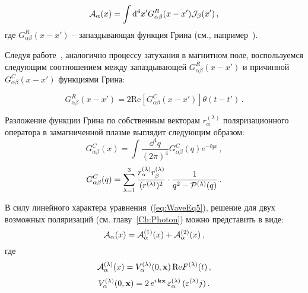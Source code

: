 \begin{equation}\label{eq:RetSol}
	{\cal A}_\alpha(x)=\int \mathrm{d}^4 x' G^R_{\alpha \beta}(x-x'){\cal J}_\beta(x')\, ,
\end{equation}
где $G^R_{\alpha \beta}(x-x')$ -- запаздывающая функция Грина (см., например~\cite{Landau:2001}).

Следуя работе~\cite{MikhChist:2001}, аналогично процессу затухания в магнитном 
поле, воспользуемся следующим соотношением между запаздывающей 
$G^R_{\alpha\beta}(x-x')$ и причинной $G^C_{\alpha\beta}(x-x')$ функциями Грина:

\begin{equation}\label{eq:RetCasualGreen}
G^R_{\alpha\beta}(x-x')= 2 \mathrm{Re} \left[G^C_{\alpha\beta}(x-x')\right]\theta(t-t')\, .
\end{equation}

Разложение функции Грина по собственным векторам 
$r_\alpha^{(\lambda)}$ поляризационного оператора в замагниченной плазме 
выглядит следующим образом:
\begin{equation}\label{eq:InvGcFourier}
	G^C_{\alpha\beta}(x)=\int \frac{\dd^4q}{(2\pi)^4}G^C_{\alpha \beta}(q) e^{-\ii qx}\, ,
\end{equation}
\begin{equation}\label{eq:GcFourier}
	G^C_{\alpha\beta}(q)=\sum_{\lambda=1}^{3}\frac{r_\alpha^{(\lambda)}r^{(\lambda)}_\beta}{(r^{(\lambda)})^2}\cdot
	 \frac{1}{q^2-{\cal P}^{(\lambda)}(q)}\, .
\end{equation}


В силу линейного характера уравнения~(\ref{eq:WaveEq5}), 
решение для двух возможных поляризаций (см. 
главу~\ref{Ch:Photon}) можно представить в виде:
\begin{equation}\label{eq:ASoveDivide}
	{\cal A}_\alpha(x)={\cal A}^{(1)}_\alpha(x)+{\cal A}^{(2)}_\alpha(x)\, ,
\end{equation}
где 
%
\begin{eqnarray}\label{eq:ASoveF}                     		
{\cal A}^{(\lambda)}_{\alpha} (x) = V^{(\lambda)}_\alpha (0, {\bf x}) \, \text{Re} F^{(\lambda)} (t) \, ,
\label{eq:V}
\end{eqnarray}
\begin{eqnarray}
V^{(\lambda)}_\alpha (0, {\bf x}) = 2\, e^{ i\, {\bf k x}} \, 
\varepsilon^{(\lambda)}_\alpha \, (\varepsilon^{(\lambda)} j)\, .
\label{eq:partialV}
\end{eqnarray}
%

